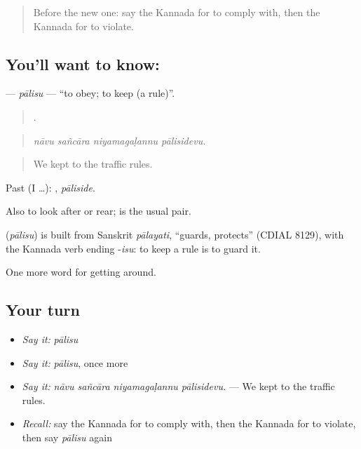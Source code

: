 \label{lesson:KA-C444-palisu}



\begin{quote}
Before the new one: say the Kannada for to comply with, then the Kannada for to violate.
\end{quote}

\subsection*{You'll want to know: }
\textbf{} — \emph{pālisu} — \textquotedblleft{}to obey; to keep (a rule)\textquotedblright{}.

\begin{quote}
   .
\end{quote}

\begin{quote}
\emph{nāvu sañcāra niyamagaḷannu pālisidevu.}
\end{quote}

\begin{quote}
We kept to the traffic rules.
\end{quote}

Past (I …): , \emph{pāliside}.

Also to look after or rear;   is the usual pair.

\begin{cousinweb}
\textbf{} (\emph{pālisu}) is built from Sanskrit \emph{pālayati}, \textquotedblleft{}guards, protects\textquotedblright{} (CDIAL 8129), with the Kannada verb ending -\emph{isu}: to keep a rule is to guard it.
\end{cousinweb}

\begin{grammarlens}[title={What you've built}]
One more word for getting around.
\end{grammarlens}

\subsection*{Your turn}
\begin{itemize}
\raggedright
  \item \emph{Say it:} \emph{pālisu}
  \item \emph{Say it:} \emph{pālisu}, once more
  \item \emph{Say it:} \emph{nāvu sañcāra niyamagaḷannu pālisidevu.} — We kept to the traffic rules.
  \item \emph{Recall:} say the Kannada for to comply with, then the Kannada for to violate, then say \emph{pālisu} again
\end{itemize}

